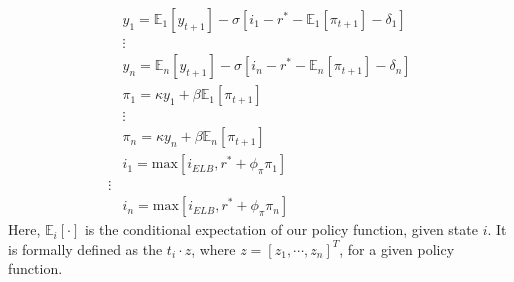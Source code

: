 \documentclass[11pt]{article}
\begin{document}
\begin{singlespace}
		\begin{align*}
		& y_{1} = \mathbb{E}_1[y_{t+1}] - \sigma\left[i_1 - r^* - \mathbb{E}_1[\pi_{t+1} ]-\delta_1\right] \\
		&\vdots \nonumber\\
		& y_{n} = \mathbb{E}_n[y_{t+1}] - \sigma\left[i_n - r^* - \mathbb{E}_n[\pi_{t+1} ]-\delta_n\right]\\ 
		& \pi_1  = \kappa y_1 + \beta\mathbb{E}_1[\pi_{t+1}]\\
		&\vdots \nonumber\\
		& \pi_n  = \kappa y_n + \beta\mathbb{E}_n[\pi_{t+1}]\\
		& i_1 = \text{max}\left[i_{ELB},r^*  + \phi_{\pi}\pi_1\right]\\
		\vdots \nonumber\\
		& i_n = \text{max}\left[i_{ELB},r^*  + \phi_{\pi}\pi_n\right]
		\end{align*}
		Here, $\mathbb{E}_i[\cdot]$ is the conditional expectation of our policy function, given state $i$. It is formally defined as the $t_i\cdot z$, where $z = [z_1,\cdots,z_n]^{T}$, for a given policy function. 
		

\end{singlespace}
\end{document}
